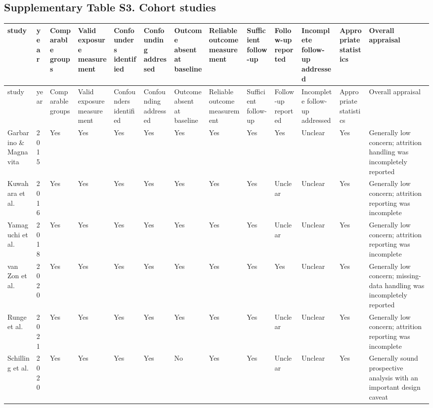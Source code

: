 \documentclass[10pt]{article}
\begin{document}
\subsection*{Supplementary Table S3. Cohort studies}
\scriptsize
\begin{longtable}{p{} p{} p{} p{} p{} p{} p{} p{} p{} p{} p{} p{} p{}}
\toprule
study & year & Comparable groups & Valid exposure measurement & Confounders identified & Confounding addressed & Outcome absent at baseline & Reliable outcome measurement & Sufficient follow-up & Follow-up reported & Incomplete follow-up addressed & Appropriate statistics & Overall appraisal \\
\midrule
\endfirsthead
\toprule
study & year & Comparable groups & Valid exposure measurement & Confounders identified & Confounding addressed & Outcome absent at baseline & Reliable outcome measurement & Sufficient follow-up & Follow-up reported & Incomplete follow-up addressed & Appropriate statistics & Overall appraisal \\
\midrule
\endhead
Garbarino \& Magnavita & 2015 & Yes & Yes & Yes & Yes & Yes & Yes & Yes & Yes & Unclear & Yes & Generally low concern; attrition handling was incompletely reported \\
Kuwahara et al. & 2016 & Yes & Yes & Yes & Yes & Yes & Yes & Yes & Unclear & Unclear & Yes & Generally low concern; attrition reporting was incomplete \\
Yamaguchi et al. & 2018 & Yes & Yes & Yes & Yes & Yes & Yes & Yes & Unclear & Unclear & Yes & Generally low concern; attrition reporting was incomplete \\
van Zon et al. & 2020 & Yes & Yes & Yes & Yes & Yes & Yes & Yes & Yes & Unclear & Yes & Generally low concern; missing-data handling was incompletely reported \\
Runge et al. & 2021 & Yes & Yes & Yes & Yes & Yes & Yes & Yes & Unclear & Unclear & Yes & Generally low concern; attrition reporting was incomplete \\
Schilling et al. & 2020 & Yes & Yes & Yes & Yes & No & Yes & Yes & Unclear & Unclear & Yes & Generally sound prospective analysis with an important design caveat \\
\bottomrule
\end{longtable}
\normalsize
\end{document}
